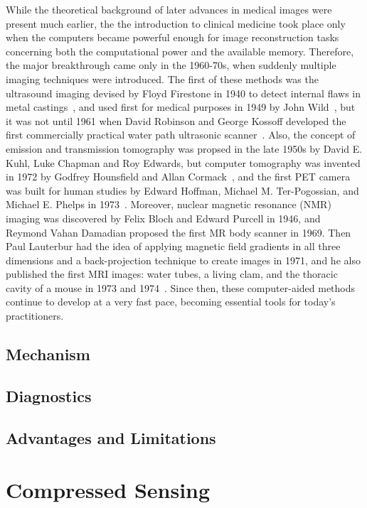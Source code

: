 While the theoretical background of later advances in medical images were present much earlier, the the introduction to clinical medicine took place only when the computers became powerful enough for image reconstruction tasks concerning both the computational power and the available memory. Therefore, the major breakthrough came only in the 1960-70s, when suddenly multiple imaging techniques were introduced. The first of these methods was the ultrasound imaging devised by Floyd Firestone in 1940 to detect internal flaws in metal castings~\cite{singh_origin_2007}, and used first for medical purposes in 1949 by John Wild~\cite{watts_john_2009}, but it was not until 1961 when David Robinson and George Kossoff developed the first commercially practical water path ultrasonic scanner~\cite{griffiths_historical_nodate}. Also, the concept of emission and transmission tomography was propsed in the late 1950s by David E. Kuhl, Luke Chapman and Roy Edwards, but computer tomography was invented in 1972 by Godfrey Hounsfield and Allan Cormack~\cite{richmond_sir_2004}, and the first PET camera was built for human studies by Edward Hoffman, Michael M. Ter-Pogossian, and Michael E. Phelps in 1973~\cite{noauthor_us_nodate}. Moreover, nuclear magnetic resonance (NMR) imaging was discovered by Felix Bloch and Edward Purcell in 1946, and Reymond Vahan Damadian proposed the first MR body scanner in 1969. Then Paul Lauterbur had the idea of applying magnetic field gradients in all three dimensions and a back-projection technique to create images in 1971, and he also published the first MRI images: water tubes, a living clam, and the thoracic cavity of a mouse in 1973 and 1974~\cite{rinck_short_2008}. Since then, these computer-aided methods continue to develop at a very fast pace, becoming essential tools for today's practitioners.

\subsection{Mechanism}


\subsection{Diagnostics}
\subsection{Advantages and Limitations}

\section{Compressed Sensing}
